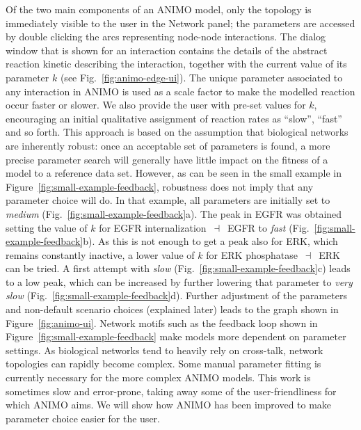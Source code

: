 \documentclass[submission,copyright,creativecommons]{eptcs}
\begin{document}
Of the two main components of an ANIMO model, only the topology is immediately visible to the user in the
Network panel; the parameters are accessed by double clicking the arcs representing node-node interactions.
The dialog window that is shown for an interaction contains the details of the abstract reaction kinetic
describing the interaction, together with the current value of its parameter $k$ (see Fig.~\ref{fig:animo-edge-ui}).
The unique parameter associated to any interaction in ANIMO is used as a scale factor to make the modelled
reaction occur faster or slower. We also provide the user with pre-set values for
$k$, encouraging an initial qualitative assignment of reaction rates as ``slow'', ``fast'' and so forth.
This approach is based on the assumption that biological networks are inherently robust:
once an acceptable set of parameters is found, a more precise parameter search will generally have
little impact on the fitness of a model to a reference data set.
However, as can be seen in the small example in Figure~\ref{fig:small-example-feedback},
robustness does not imply that any parameter choice will do.
In that example, all parameters are initially set to \emph{medium}
(Fig.~\ref{fig:small-example-feedback}{\sf a}).
The peak in EGFR was obtained setting the value of $k$ for {\sf EGFR internalization}~$\dashv$~{\sf EGFR}
to \emph{fast} (Fig.~\ref{fig:small-example-feedback}{\sf b}). As this is not enough
to get a peak also for ERK, which remains constantly inactive, a lower value of $k$
for {\sf ERK phosphatase}~$\dashv$~{\sf ERK} can be tried. A first attempt with
\emph{slow} (Fig.~\ref{fig:small-example-feedback}{\sf c}) leads to a low peak,
which can be increased by further lowering that parameter to \emph{very slow}
(Fig.~\ref{fig:small-example-feedback}{\sf d}). Further adjustment of the parameters
and non-default scenario choices (explained later) leads to the graph shown in Figure~\ref{fig:animo-ui}.
Network motifs such as the feedback loop shown in Figure~\ref{fig:small-example-feedback}
make models more dependent on parameter settings.
As biological networks tend to heavily rely on cross-talk, network topologies can rapidly become
complex. Some manual parameter fitting is currently necessary for the more complex ANIMO models.
This work is sometimes slow and error-prone, taking away some of the user-friendliness
for which ANIMO aims.
We will show how ANIMO has been improved to make parameter choice easier for the user.
\end{document}
